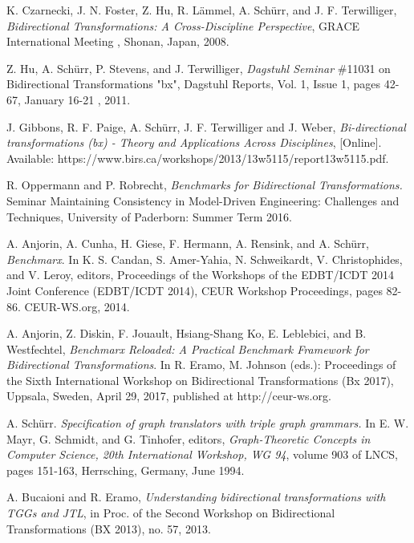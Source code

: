 \begin{thebibliography}{1}
	
	 K. Czarnecki, J. N. Foster, Z. Hu, R. L\"ammel, A. Sch\"urr, and J. F. Terwilliger,  {\em Bidirectional Transformations: A Cross-Discipline Perspective}, GRACE International Meeting , Shonan, Japan, 2008.
	
	 Z. Hu, A. Sch\"urr, P. Stevens, and J. Terwilliger,  {\em Dagstuhl Seminar} \#11031 on Bidirectional Transformations "bx", Dagstuhl Reports, Vol. 1, Issue 1, pages 42-67, January 16-21 , 2011.
	
	 J. Gibbons, R. F. Paige, A. Sch\"urr, J. F. Terwilliger and J. Weber, {\em Bi-directional transformations (bx) - Theory and Applications Across Disciplines}, [Online]. Available:  https://www.birs.ca/workshops/2013/13w5115/report13w5115.pdf.
	
	 R. Oppermann and P. Robrecht, {\em Benchmarks for Bidirectional Transformations.} Seminar Maintaining Consistency in Model-Driven Engineering: Challenges and Techniques, University of Paderborn: Summer Term 2016.
	
	 A. Anjorin, A. Cunha, H. Giese, F. Hermann, A. Rensink, and A. Sch\"urr, {\em Benchmarx}. In K. S. Candan, S. Amer-Yahia, N. Schweikardt, V. Christophides, and V. Leroy, editors, Proceedings of the Workshops of the EDBT/ICDT 2014 Joint Conference (EDBT/ICDT 2014), CEUR Workshop Proceedings, pages 82-86. CEUR-WS.org, 2014.
		
	 A. Anjorin, Z. Diskin, F. Jouault, Hsiang-Shang Ko, E. Leblebici, and B. Westfechtel, {\em Benchmarx Reloaded: A Practical Benchmark Framework for Bidirectional Transformations}. In R. Eramo, M. Johnson (eds.): Proceedings of the Sixth International Workshop on Bidirectional Transformations (Bx 2017),
	Uppsala, Sweden, April 29, 2017, published at http://ceur-ws.org.
	
	 A. Sch\"urr. {\em Specification of graph translators with triple graph grammars.} In E. W. Mayr, G. Schmidt, and G. Tinhofer, editors, {\em Graph-Theoretic
	Concepts in Computer Science, 20th International Workshop, WG 94}, volume 903 of LNCS, pages 151-163, Herrsching, Germany, June 1994.
	
	 A. Bucaioni and R. Eramo, {\em Understanding bidirectional transformations with TGGs and JTL}, in Proc. of the Second Workshop on Bidirectional Transformations (BX 2013), no. 57, 2013.
	

\end{thebibliography}
